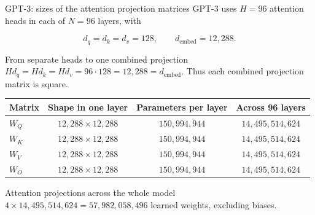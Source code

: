 \begin{frame}{GPT-3: sizes of the attention projection matrices}
  \small
  GPT-3 uses \(H=96\) attention heads in each of \(N=96\) layers, with

  \[
    d_q=d_k=d_v=128,
    \qquad
    d_{\mathrm{embed}}=12{,}288.
  \]

  \vspace{-0.8em}
  \begin{block}{From separate heads to one combined projection}
    \centering
    \(H d_q=H d_k=H d_v=96\cdot128=12{,}288=d_{\mathrm{embed}}\).
    Thus each combined projection matrix is square.
  \end{block}

  \begin{center}
    \scriptsize
    \renewcommand{\arraystretch}{1.3}
    \begin{tabular}{@{}lccc@{}}
      \toprule
      Matrix & Shape in one layer & Parameters per layer & Across 96 layers \\
      \midrule
      \(W_Q\) & \(12{,}288\times12{,}288\) & \(150{,}994{,}944\) & \(14{,}495{,}514{,}624\) \\
      \(W_K\) & \(12{,}288\times12{,}288\) & \(150{,}994{,}944\) & \(14{,}495{,}514{,}624\) \\
      \(W_V\) & \(12{,}288\times12{,}288\) & \(150{,}994{,}944\) & \(14{,}495{,}514{,}624\) \\
      \(W_O\) & \(12{,}288\times12{,}288\) & \(150{,}994{,}944\) & \(14{,}495{,}514{,}624\) \\
      \bottomrule
    \end{tabular}
  \end{center}

  \vspace{-0.4em}
  \begin{alertblock}{Attention projections across the whole model}
    \centering
    \(4\times14{,}495{,}514{,}624
      =57{,}982{,}058{,}496\) learned weights, excluding biases.
  \end{alertblock}
\end{frame}

